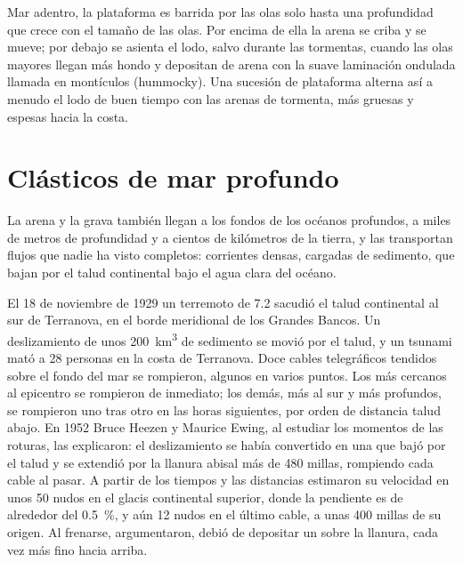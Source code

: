 Mar adentro, la plataforma es barrida por las olas solo hasta una profundidad que crece con el tamaño de las olas. Por encima de ella la arena se criba y se mueve; por debajo se asienta el lodo,
salvo durante las tormentas, cuando las olas mayores llegan más hondo y depositan  de arena con la suave laminación ondulada llamada  en montículos (hummocky).
Una sucesión de plataforma alterna así a menudo el lodo de buen tiempo con las arenas de tormenta, más gruesas y espesas hacia la costa.

\section{Clásticos de mar profundo}\label{sec:b1:clastic-sediments:deep-sea}

La arena y la grava también llegan a los fondos de los océanos profundos, a miles de metros de profundidad y a cientos de kilómetros de la tierra, y las transportan flujos que nadie ha visto
completos: corrientes densas, cargadas de sedimento, que bajan por el talud continental bajo el agua clara del océano.

\begin{history}
El 18 de noviembre de 1929 un terremoto de  7.2 sacudió el talud continental al sur de Terranova, en el borde meridional de los Grandes Bancos. Un deslizamiento
de unos \qty{200}{km^3} de sedimento se movió por el talud, y un tsunami mató a 28 personas en la costa de Terranova. Doce cables telegráficos tendidos sobre el fondo del mar se
rompieron, algunos en varios puntos. Los más cercanos al epicentro se rompieron de inmediato; los demás, más al sur y más profundos, se rompieron uno tras otro en las horas siguientes,
por orden de distancia talud abajo. En 1952 Bruce Heezen y Maurice Ewing, al estudiar los momentos de las roturas, las explicaron: el deslizamiento se había convertido en una  que bajó por el talud y se extendió por la llanura abisal más de 480 millas, rompiendo cada cable al pasar. A partir de los tiempos y las distancias estimaron su velocidad en
unos 50 nudos en el glacis continental superior, donde la pendiente es de alrededor del \qty{0.5}{\percent}, y aún 12 nudos en el último cable, a unas 400 millas de su origen. Al frenarse,
argumentaron, debió de depositar un  sobre la llanura, cada vez más fino hacia arriba.
\end{history}

